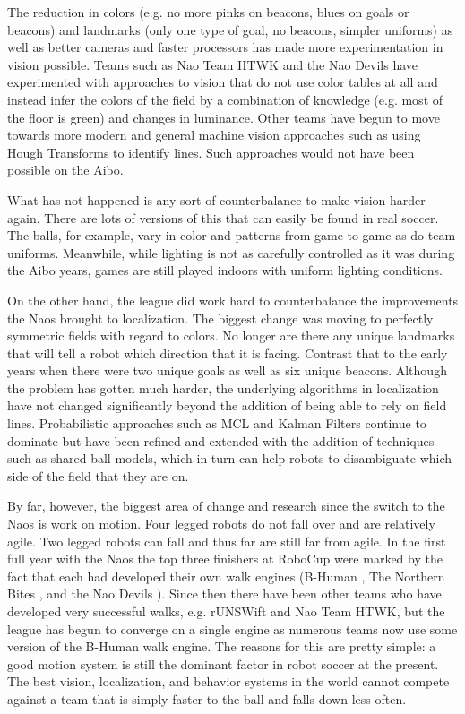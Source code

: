 \documentclass{llncs}
\begin{document}
The reduction in colors (e.g. no more pinks on beacons, blues on goals
or beacons) and landmarks (only one type of goal, no beacons,
simpler uniforms) as well as better cameras and faster processors has
made more experimentation in vision possible. Teams such as
Nao Team HTWK and the Nao Devils have experimented with approaches
to vision that do not use color tables at all and instead infer the colors
of the field by a combination of knowledge (e.g. most of the floor
is green) and changes in luminance.  Other teams have begun to move towards 
more modern and general machine
vision approaches such as using Hough Transforms to identify lines. Such approaches
would not have been possible on the Aibo.

What has not happened is any sort of counterbalance to make vision
harder again. There are lots of versions of this that can easily be found
in real soccer. The balls, for example, vary in color and patterns from game
to game as do team uniforms. Meanwhile, while lighting is not as carefully
controlled as it was during the Aibo years, games are still played indoors with
uniform lighting conditions.

On the other hand, the league did work hard to counterbalance the
improvements the Naos brought to localization. The biggest change
was moving to perfectly symmetric fields with regard to colors. No longer
are there any unique landmarks that will tell a robot which direction that
it is facing. Contrast that to the early years when there were two unique
goals as well as six unique beacons. Although the problem has gotten
much harder, the underlying algorithms in localization have not changed significantly
beyond the addition of being able to rely on field lines. 
Probabilistic approaches such as MCL and Kalman Filters continue
to dominate but have been refined and extended with the addition of techniques such
as shared ball models, which in turn can help robots to disambiguate
which side of the field that they are on.

By far, however, the biggest area of change and research since the
switch to the Naos is work on motion. Four legged robots do not fall
over and are relatively agile. Two legged robots can fall and thus far
are still far from agile. In the first full year with the Naos the top three
finishers at RoboCup were marked by the fact that each had developed
their own walk engines (B-Human \cite{NaoWalking-WHSR-2009}, The Northern Bites \cite{strom-10}, and the
Nao Devils \cite{czarnetzki}). Since then there have been other teams who have developed
very successful walks, e.g.  rUNSWift and Nao Team HTWK,
but the league has begun to converge on a single engine as numerous
teams now use some version of the B-Human walk engine. The reasons
for this are pretty simple: a good motion system is still the dominant factor
in robot soccer at the present. The best vision, localization, and behavior
systems in the world cannot compete against a team that is simply
faster to the ball and falls down less often.
\end{document}
